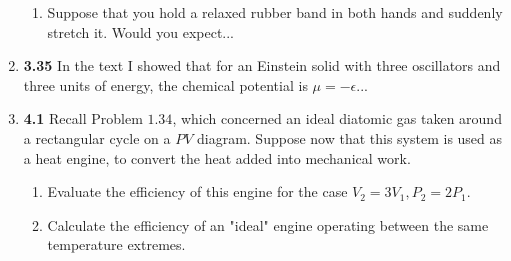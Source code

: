 \documentclass[fleqn]{article}
\begin{document}
\begin{enumerate}
\begin{enumerate}

      \item Suppose that you hold a relaxed rubber band in both hands and suddenly stretch it. Would you expect...


    \end{enumerate}

    \item \textbf{3.35} In the text I showed that for an Einstein solid with three oscillators and three units of 
    energy, the chemical potential is $\mu=-\epsilon$...


    \item \textbf{4.1} Recall Problem $1.34$, which concerned an ideal diatomic gas taken around a rectangular
    cycle on a $PV$ diagram. Suppose now that this system is used as a heat engine, to convert the heat added
    into mechanical work.
    \begin{enumerate}
      \item Evaluate the efficiency of this engine for the case $V_2=3V_1, P_2=2P_1$.


      \item Calculate the efficiency of an "ideal" engine operating between the same temperature extremes.


    \end{enumerate}

  \end{enumerate}
\end{document}
